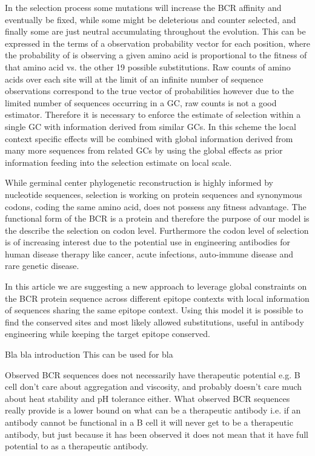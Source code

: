 In the selection process some mutations will increase the BCR affinity and eventually be fixed, while some might be deleterious and counter selected, and finally some are just neutral accumulating throughout the evolution.
This can be expressed in the terms of a observation probability vector for each position, where the probability of is observing a given amino acid is proportional to the fitness of that amino acid vs.
the other 19 possible substitutions.
Raw counts of amino acids over each site will at the limit of an infinite number of sequence observations correspond to the true vector of probabilities however due to the limited number of sequences occurring in a GC, raw counts is not a good estimator.
Therefore it is necessary to enforce the estimate of selection within a single GC with information derived from similar GCs.
In this scheme the local context specific effects will be combined with global information derived from many more sequences from related GCs by using the global effects as prior information feeding into the selection estimate on local scale.

While germinal center phylogenetic reconstruction is highly informed by nucleotide sequences, selection is working on protein sequences and synonymous codons, coding the same amino acid, does not possess any fitness advantage.
The functional form of the BCR is a protein and therefore the purpose of our model is the describe the selection on codon level.
Furthermore the codon level of selection is of increasing interest due to the potential use in engineering antibodies for human disease therapy like cancer, acute infections, auto-immune disease and rare genetic disease.

In this article we are suggesting a new approach to leverage global constraints on the BCR protein sequence across different epitope contexts with local information of sequences sharing the same epitope context.
Using this model it is possible to find the conserved sites and most likely allowed substitutions, useful in antibody engineering while keeping the target epitope conserved.












Bla bla introduction
This can be used for bla


Observed BCR sequences does not necessarily have therapeutic potential e.g. B cell don't care about aggregation and viscosity, and probably doesn't care much about heat stability and pH tolerance either.
What observed BCR sequences really provide is a lower bound on what can be a therapeutic antibody i.e. if an antibody cannot be functional in a B cell it will never get to be a therapeutic antibody, but just because it has been observed it does not mean that it have full potential to as a therapeutic antibody.



